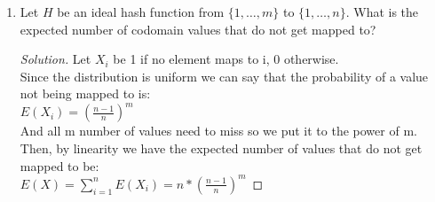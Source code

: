 \documentclass[10pt,letterpaper,unboxed,cm]{article}
\newenvironment{solution}
  {\begin{proof}[Solution]}
  {\end{proof}}
\begin{document}
\begin{enumerate}
\begin{enumerate}
\item
Let $H$ be an ideal hash function from $\{1,\dots, m\}$ to $\{1,\dots, n\}$. What is the expected number of codomain values that do not get mapped to?

\begin{solution}
    
    Let $X_i$ be 1 if no element maps to i, 0 otherwise.\\
    Since the distribution is uniform we can say that the probability of a value not being mapped to is:\\
    \(E(X_i) = (\frac{n-1}{n})^m\)\\
    And all m number of values need to miss so we put it to the power of m. Then, by linearity we have the expected number of values that do not get mapped to be:\\
    \(E(X) = \sum_{i=1}^{n} E(X_i) = \boxed{n * (\frac{n-1}{n})^m}\)

\end{solution}

\end{enumerate}

\end{enumerate}
\end{document}

